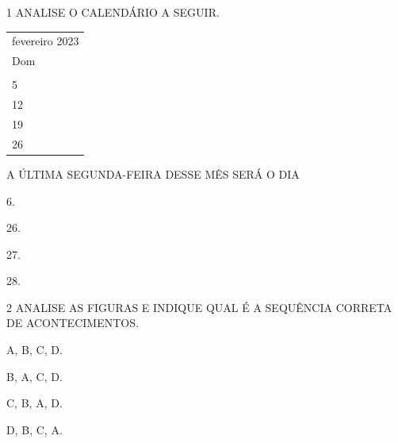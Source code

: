 \num{1} ANALISE O CALENDÁRIO A SEGUIR.

\begin{longtable}[]{@{}l@{}}
\toprule
fevereiro 2023\tabularnewline
Dom\tabularnewline
\tabularnewline
5\tabularnewline
12\tabularnewline
19\tabularnewline
26\tabularnewline
\bottomrule
\end{longtable}

A ÚLTIMA SEGUNDA-FEIRA DESSE MÊS SERÁ O DIA

\begin{escolha}
\item 6.

\item 26.

\item 27.

\item 28.
\end{escolha}



\num{2} ANALISE AS FIGURAS E INDIQUE QUAL É A SEQUÊNCIA CORRETA DE
ACONTECIMENTOS.





\begin{escolha}
\item A, B, C, D.

\item B, A, C, D.

\item C, B, A, D.

\item D, B, C, A.
\end{escolha}

